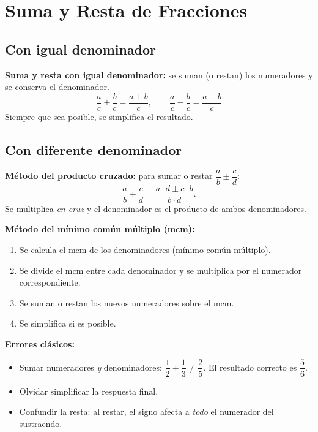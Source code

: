 \documentclass[12pt, letterpaper]{article}
\begin{document}
\section{Suma y Resta de Fracciones}

\subsection{Con igual denominador}

\begin{cuadroteoria}
  \textbf{Suma y resta con igual denominador:} se suman (o restan) los numeradores y se conserva el denominador.
  $$\frac{a}{c} + \frac{b}{c} = \frac{a + b}{c}, \qquad \frac{a}{c} - \frac{b}{c} = \frac{a - b}{c}$$
  Siempre que sea posible, se simplifica el resultado.
\end{cuadroteoria}

\subsection{Con diferente denominador}

\begin{cuadroteoria}
  \textbf{Método del producto cruzado:} para sumar o restar $\dfrac{a}{b} \pm \dfrac{c}{d}$:
  $$\frac{a}{b} \pm \frac{c}{d} = \frac{a \cdot d \pm c \cdot b}{b \cdot d}.$$
  Se multiplica \emph{en cruz} y el denominador es el producto de ambos denominadores.
\end{cuadroteoria}

\begin{cuadroteoria}
  \textbf{Método del mínimo común múltiplo (mcm):}
  \begin{enumerate}[leftmargin=*]
    \item Se calcula el mcm de los denominadores (mínimo común múltiplo).
    \item Se divide el mcm entre cada denominador y se multiplica por el numerador correspondiente.
    \item Se suman o restan los nuevos numeradores sobre el mcm.
    \item Se simplifica si es posible.
  \end{enumerate}
\end{cuadroteoria}

\begin{cuadroadvertencia}
  \textbf{Errores clásicos:}
  \begin{itemize}[leftmargin=*]
    \item Sumar numeradores \emph{y} denominadores: $\dfrac{1}{2} + \dfrac{1}{3} \neq \dfrac{2}{5}$. El resultado correcto es $\dfrac{5}{6}$.
    \item Olvidar simplificar la respuesta final.
    \item Confundir la resta: al restar, el signo afecta a \emph{todo} el numerador del sustraendo.
  \end{itemize}
\end{cuadroadvertencia}
\end{document}
